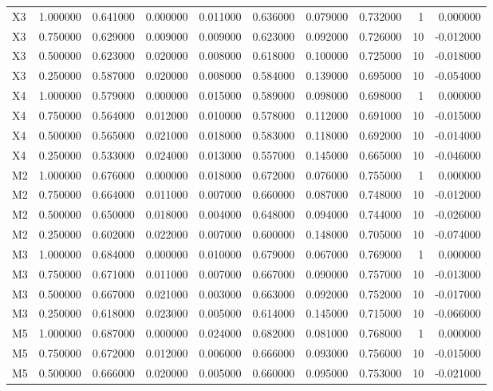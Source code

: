 \begin{table}
\begin{tabular}{lrrrrrrrrr}
X3 & 1.000000 & 0.641000 & 0.000000 & 0.011000 & 0.636000 & 0.079000 & 0.732000 & 1 & 0.000000 \\
X3 & 0.750000 & 0.629000 & 0.009000 & 0.009000 & 0.623000 & 0.092000 & 0.726000 & 10 & -0.012000 \\
X3 & 0.500000 & 0.623000 & 0.020000 & 0.008000 & 0.618000 & 0.100000 & 0.725000 & 10 & -0.018000 \\
X3 & 0.250000 & 0.587000 & 0.020000 & 0.008000 & 0.584000 & 0.139000 & 0.695000 & 10 & -0.054000 \\
X4 & 1.000000 & 0.579000 & 0.000000 & 0.015000 & 0.589000 & 0.098000 & 0.698000 & 1 & 0.000000 \\
X4 & 0.750000 & 0.564000 & 0.012000 & 0.010000 & 0.578000 & 0.112000 & 0.691000 & 10 & -0.015000 \\
X4 & 0.500000 & 0.565000 & 0.021000 & 0.018000 & 0.583000 & 0.118000 & 0.692000 & 10 & -0.014000 \\
X4 & 0.250000 & 0.533000 & 0.024000 & 0.013000 & 0.557000 & 0.145000 & 0.665000 & 10 & -0.046000 \\
M2 & 1.000000 & 0.676000 & 0.000000 & 0.018000 & 0.672000 & 0.076000 & 0.755000 & 1 & 0.000000 \\
M2 & 0.750000 & 0.664000 & 0.011000 & 0.007000 & 0.660000 & 0.087000 & 0.748000 & 10 & -0.012000 \\
M2 & 0.500000 & 0.650000 & 0.018000 & 0.004000 & 0.648000 & 0.094000 & 0.744000 & 10 & -0.026000 \\
M2 & 0.250000 & 0.602000 & 0.022000 & 0.007000 & 0.600000 & 0.148000 & 0.705000 & 10 & -0.074000 \\
M3 & 1.000000 & 0.684000 & 0.000000 & 0.010000 & 0.679000 & 0.067000 & 0.769000 & 1 & 0.000000 \\
M3 & 0.750000 & 0.671000 & 0.011000 & 0.007000 & 0.667000 & 0.090000 & 0.757000 & 10 & -0.013000 \\
M3 & 0.500000 & 0.667000 & 0.021000 & 0.003000 & 0.663000 & 0.092000 & 0.752000 & 10 & -0.017000 \\
M3 & 0.250000 & 0.618000 & 0.023000 & 0.005000 & 0.614000 & 0.145000 & 0.715000 & 10 & -0.066000 \\
M5 & 1.000000 & 0.687000 & 0.000000 & 0.024000 & 0.682000 & 0.081000 & 0.768000 & 1 & 0.000000 \\
M5 & 0.750000 & 0.672000 & 0.012000 & 0.006000 & 0.666000 & 0.093000 & 0.756000 & 10 & -0.015000 \\
M5 & 0.500000 & 0.666000 & 0.020000 & 0.005000 & 0.660000 & 0.095000 & 0.753000 & 10 & -0.021000 \\

\end{tabular}
\end{table}
